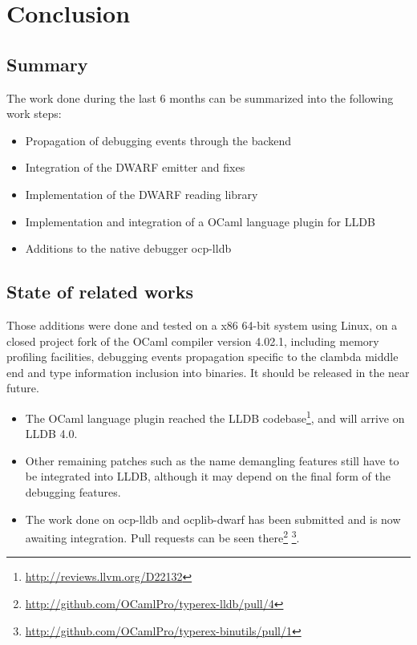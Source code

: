 \chapter{Conclusion\label{cha:chapter5}}

\section{Summary\label{sec:summary}}

\noindent The work done during the last 6 months can be summarized into the following work steps:

\begin{itemize}
		\item Propagation of debugging events through the backend
		\vspace{-0.11in}
		\item Integration of the DWARF emitter and fixes
		\vspace{-0.11in}
		\item Implementation of the DWARF reading library
		\vspace{-0.11in}
		\item Implementation and integration of a OCaml language plugin for LLDB
		\vspace{-0.11in}
		\item Additions to the native debugger ocp-lldb
\end{itemize}

\section{State of related works\label{sec:outlook}}

Those additions were done and tested on a x86 64-bit system using Linux, on a
closed project fork of the OCaml compiler version 4.02.1, including memory
profiling facilities, debugging events propagation specific to the clambda
middle end and type information inclusion into binaries.
It should be released in the near future.

\begin{itemize}

\item
The OCaml language plugin reached the LLDB
codebase\footnote{\url{http://reviews.llvm.org/D22132}}, and will arrive on LLDB
4.0.

\item Other remaining patches such as the name demangling features
still have to be integrated into LLDB, although it
may depend on the final form of the debugging features.

\item The work done on ocp-lldb and ocplib-dwarf has been submitted and is now
awaiting integration.
Pull requests can be seen
there\footnote{\url{http://github.com/OCamlPro/typerex-lldb/pull/4}}
\footnote{\url{http://github.com/OCamlPro/typerex-binutils/pull/1}}.
\end{itemize}

